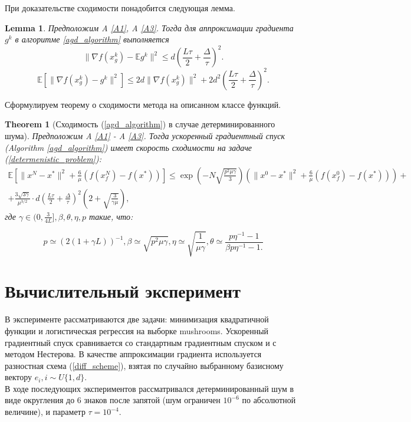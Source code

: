 \documentclass{article}
\newtheorem{theorem}{Theorem}
\newtheorem{lemma}{Lemma}
\begin{document}
При доказательстве сходимости понадобится следующая лемма.
\begin{lemma}\label{lemma1}
 Предположим A \ref{A1}, A \ref{A3}. Тогда для аппроксимации градиента $g^k$ в алгоритме \ref{agd_algorithm} выполняется
 \begin{equation}
  \|\nabla f(x_g^k) - \mathbb{E}g^k\|^2 \leqslant d \left(\frac{L\tau}{2} + \frac{\Delta}{\tau}\right)^2.
  \label{norm_of_expectation}
 \end{equation}
 \begin{equation}
  \mathbb{E}[\|\nabla f(x_g^k) - g^k\|^2] \leqslant 2d \|\nabla f(x_g^k)\|^2 + 2 d^2 \left(\frac{L\tau}{2} + \frac{\Delta}{\tau}\right)^2.
  \label{expectation_of_norm}
 \end{equation}
\end{lemma}

Сформулируем теорему о сходимости метода на описанном классе функций.

\begin{theorem}[Сходимость (\ref{agd_algorithm}) в случае детерминированного шума]\label{theorem1}
  Предположим A \ref{A1} - A \ref{A3}. Тогда ускоренный градиентный спуск (Algorithm \ref{agd_algorithm}) имеет скорость сходимости на задаче (\ref{determenistic_problem}):
  \begin{equation}
   \begin{aligned}
   \mathbb{E}\left[\|x^N - x^*\|^2 + \frac{6}{\mu} (f(x_f^N) - f(x^*))\right] \leqslant \exp\left(- N\sqrt{\frac{p^2\mu\gamma}{3}}\right) \left(\|x^0 - x^*\|^2 + \frac{6}{\mu} (f(x_f^0) - f(x^*))\right) +\\ +\frac{3 \sqrt{3\gamma}}{\mu^{3/2}} \cdot d \left(\frac{L\tau}{2} + \frac{\Delta}{\tau}\right)^2\left(2 + \sqrt{\frac{3}{\gamma\mu}}\right),
   \label{deterministic_convergence}
   \end{aligned}
  \end{equation}
  где $\gamma \in (0, \frac{3}{4L}], \beta, \theta, \eta, p$ такие, что:

  \begin{equation}
   p \simeq (2(1 + \gamma L))^{-1}, \beta \simeq \sqrt{p^2 \mu \gamma}, \eta \simeq \sqrt{\frac{1}{\mu\gamma}}, \theta \simeq \frac{p \eta^{-1} - 1}{\beta p \eta^{-1} - 1.}
  \end{equation}

\end{theorem}

\section{Вычислительный эксперимент}
В эксперименте рассматриваются две задачи: минимизация квадратичной функции и логистическая регрессия на выборке mushrooms. Ускоренный градиентный спуск сравнивается со стандартным градиентным спуском и с методом Нестерова. В качестве аппроксимации градиента используется разностная схема (\ref{diff_scheme}), взятая по случайно выбранному базисному вектору $e_i, i \sim U\{1, d\}$.\\
В ходе последующих экспериментов рассматривался детерминированный шум в виде округления до 6 знаков после запятой (шум ограничен $10^{-6}$ по абсолютной величине), и параметр $\tau = 10^{-4}$.
\end{document}
